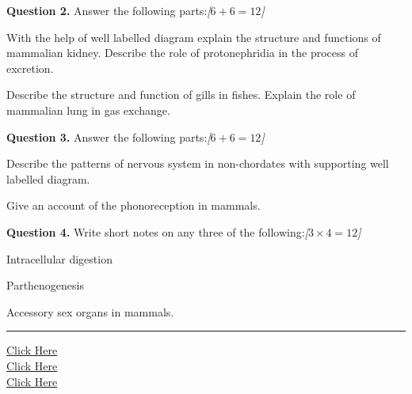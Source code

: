 \documentclass[11pt,a4paper]{article}
\newcommand{\pts}[1]{\hfill   \textit{[#1]}}
\begin{document}
\medskip


\noindent   \textbf{Question 2.} Answer the following parts:\pts{$6 + 6 = 12$}

\begin{parts}
  \item With the help of well labelled diagram explain the structure and functions of mammalian kidney. Describe the role of protonephridia in the process of excretion.
  \item Describe the structure and function of gills in fishes. Explain the role of mammalian lung in gas exchange.
\end{parts}

\medskip


\noindent   \textbf{Question 3.} Answer the following parts:\pts{$6 + 6 = 12$}

\begin{parts}
  \item Describe the patterns of nervous system in non-chordates with supporting well labelled diagram.
  \item Give an account of the phonoreception in mammals.
\end{parts}

\medskip


\noindent   \textbf{Question 4.} Write short notes on any three of the following:\pts{$3  \times 4 = 12$}

\begin{parts}
  \item Intracellular digestion
  \item Parthenogenesis
  \item Accessory sex organs in mammals.
\end{parts}

\vfill
\rule{\linewidth}{0.4pt}

\begin{center}\small
\href{https://bhu-exam.vercel.app/}{Click Here}\\[4pt]\href{https://me-aryan.vercel.app/}{Click Here}\\[4pt]\href{https://quashan-me.vercel.app/}{Click Here}
\end{center}
\end{document}
